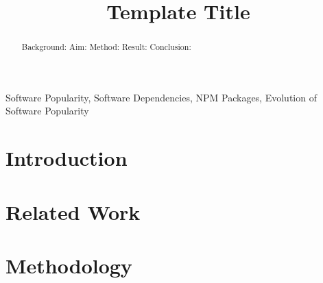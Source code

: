 \documentclass[10pt, conference]{IEEEtran}
\begin{document}
\title{Template Title}



\maketitle

\begin{abstract}
Background: 
Aim: 
Method: 
Result: 
Conclusion: 
\end{abstract}

\begin{IEEEkeywords}
Software Popularity, Software Dependencies, NPM Packages, Evolution of Software Popularity
\end{IEEEkeywords}

\section{Introduction}\label{s:intro}




\section{Related Work}\label{s:relwork}




\section{Methodology}\label{s:method}
\end{document}
